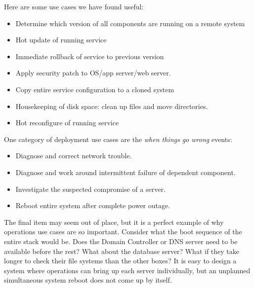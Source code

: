 \documentclass[draft]{report}
\begin{document}
Here are some use cases we have found useful:

\begin{itemize}

\item Determine which version of all components are running on a remote
system

\item Hot update of running service

\item Immediate rollback of service to previous version

\item Apply security patch to OS/app server/web server.

\item Copy entire service configuration to a cloned system

\item Housekeeping of disk space: clean up files and move directories.

\item Hot reconfigure of running service

\end{itemize}

One category of deployment use cases are the \emph{when things go wrong}
events:

\begin{itemize}

\item Diagnose and correct network trouble.

\item Diagnose and work around intermittent failure of dependent
component.

\item Investigate the suspected compromise of a server.

\item Reboot entire system after complete power outage.

\end{itemize}

The final item may seem out of place, but it is a perfect example of why
operations use cases are so important. Consider what the boot sequence
of the entire stack would be. Does the Domain Controller or DNS server
need to be available before the rest? What about the database server?
What if they take longer to check their file systems than the other
boxes? It is easy to design a system where operations can bring up each
server individually, but an unplanned simultaneous system reboot does
not come up by itself.
\end{document}
